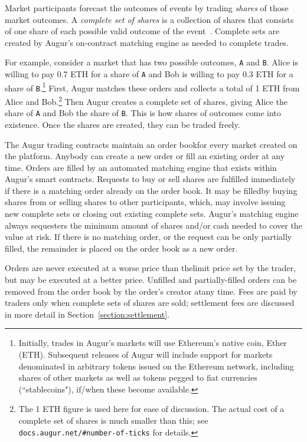 \documentclass[12pt,floatfix,reprint,nofootinbib,amsmath,amssymb,epsfig,pre,floats,letterpaper,groupedaffiliation]{revtex4-1}
\theoremstyle{definition}
\theoremstyle{definition}
\begin{document}
Market participants forecast the outcomes of events by trading \textit{shares} of those market outcomes. A \textit{complete set of shares} is a collection of shares that consists of one share of each possible valid outcome of the event~\cite{Clark_2014}. Complete sets are created by Augur's on-contract matching engine as needed to complete trades.

For example, consider a market that has two possible outcomes, \texttt{A} and \texttt{B}. Alice is willing to pay 0.7 ETH for a share of \texttt{A} and Bob is willing to pay 0.3 ETH for a share of \texttt{B}.\footnote{Initially, trades in Augur's markets will use Ethereum's native coin, Ether (ETH). Subsequent releases of Augur will include support for markets denominated in arbitrary tokens issued on the Ethereum network, including shares of other markets as well as tokens pegged to fiat currencies (``stablecoins"), if/when these become available.} First, Augur matches these orders and collects a total of 1 ETH from Alice and Bob.\footnote{\label{footnote:complete_set_cost}The 1 ETH figure is used here for ease of discussion. The actual cost of a complete set of shares is much smaller than this; see \texttt{docs.augur.net/\#number-of-ticks} for details.} Then Augur creates a complete set of shares, giving Alice the share of \texttt{A} and Bob the share of \texttt{B}. This is how shares of outcomes come into existence. Once the shares are created, they can be traded freely.

The Augur trading contracts maintain an order book\linebreak for every market created on the platform. Anybody can create a new order or fill an existing order at any time. Orders are filled by an automated matching engine that exists within Augur's smart contracts. Requests to buy or sell shares are fulfilled immediately if there is a matching order already on the order book. It may be filled\linebreak by buying shares from or selling shares to other partic\-ipants, which, may involve issuing new complete sets or closing out existing complete sets. Augur's matching engine always sequesters the minimum amount of shares and/or cash needed to cover the value at risk. If there is no matching order, or the request can be only partially filled, the remainder is placed on the order book as a new order.

Orders are never executed at a worse price than the\linebreak limit price set by the trader, but may be executed at a better price. Unfilled and partially-filled orders can be removed from the order book by the order's creator at\linebreak any time. Fees are paid by traders only when complete sets of shares are sold; settlement fees are discussed in more detail in Section~\ref{section:settlement}.
\end{document}
